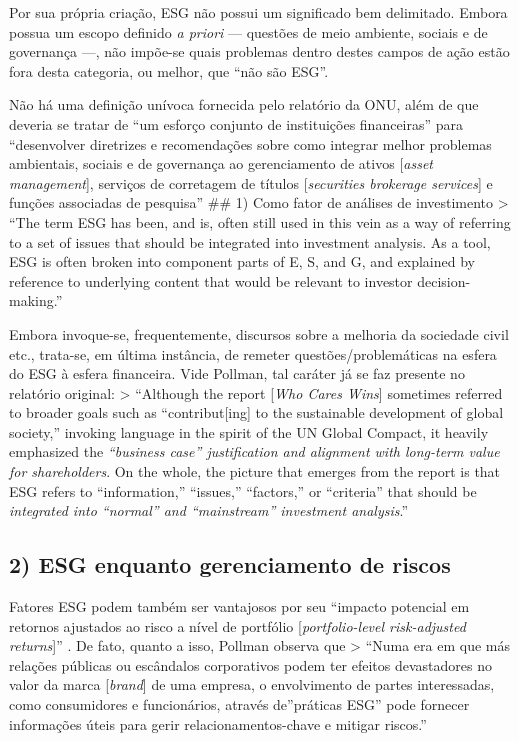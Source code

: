 \documentclass[12pt]{article}
\numberwithin{equation}{section}
\theoremstyle{plain}
\theoremstyle{definition}
\theoremstyle{remark}
\begin{document}
Por sua própria criação, ESG não possui um significado bem delimitado. Embora possua um escopo definido \textit{a priori} --- questões de meio ambiente, sociais e de governança ---, não impõe-se quais problemas dentro destes campos de ação estão fora desta categoria, ou melhor, que ``não são ESG''.

Não há uma definição unívoca fornecida pelo relatório da ONU, além de que deveria se tratar de ``um esforço conjunto de instituições financeiras'' para ``desenvolver diretrizes e recomendações sobre como integrar melhor problemas ambientais, sociais e de governança ao gerenciamento de ativos {[}\textit{asset management}{]}, serviços de corretagem de títulos {[}\textit{securities brokerage services}{]} e funções associadas de pesquisa'' \parencite[, p. vii]{GlobalCompact2004} \#\# 1) Como fator de análises de investimento \textgreater{} ``The term ESG has been, and is, often still used in this vein as a way of referring to a set of issues that should be integrated into investment analysis. As a tool, ESG is often broken into component parts of E, S, and G, and explained by reference to underlying content that would be relevant to investor decision-making.'' \parencite[, p. 21]{Pollman2022}

Embora invoque-se, frequentemente, discursos sobre a melhoria da sociedade civil etc., trata-se, em última instância, de remeter questões/problemáticas na esfera do ESG à esfera financeira. Vide Pollman, tal caráter já se faz presente no relatório original: \textgreater{} ``Although the report {[}\textit{Who Cares Wins}{]} sometimes referred to broader goals such as ``contribut{[}ing{]} to the sustainable development of global society,'' invoking language in the spirit of the UN Global Compact, it heavily emphasized the \textit{``business case'' justification and alignment with long-term value for shareholders}. On the whole, the picture that emerges from the report is that ESG refers to ``information,'' ``issues,'' ``factors,'' or ``criteria'' that should be \textit{integrated into ``normal'' and ``mainstream'' investment analysis}.'' \parencite[, p. 20-1, grifo meu]{Pollman2022}

\hypertarget{esg-enquanto-gerenciamento-de-riscos}{%
\subsection{2) ESG enquanto gerenciamento de riscos}\label{esg-enquanto-gerenciamento-de-riscos}}

Fatores ESG podem também ser vantajosos por seu ``impacto potencial em retornos ajustados ao risco a nível de portfólio {[}\textit{portfolio-level risk-adjusted returns}{]}'' \parencite[, p. 22]{Pollman2022}. De fato, quanto a isso, Pollman observa que \textgreater{} ``Numa era em que más relações públicas ou escândalos corporativos podem ter efeitos devastadores no valor da marca {[}\textit{brand}{]} de uma empresa, o envolvimento de partes interessadas, como consumidores e funcionários, através de''práticas ESG'' pode fornecer informações úteis para gerir relacionamentos-chave e mitigar riscos.'' \parencite[, p. 23]{Pollman2022}
\end{document}
